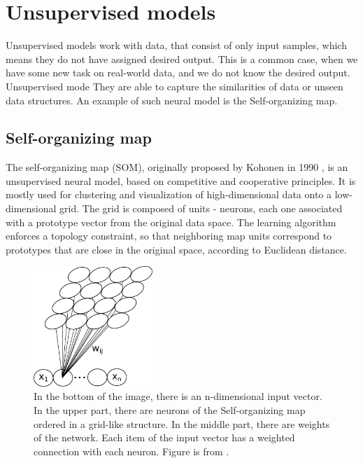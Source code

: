 \section{Unsupervised models}

Unsupervised models work with data, that consist of only input samples, which means they do not have assigned desired output. This is a common case, when we have some new task on real-world data, and we do not know the desired output. Unsupervised mode
They are able to capture the similarities of data or unseen data structures. An example of such neural model is the Self-organizing map.

\subsection{Self-organizing map}
\label{sec:som}

The self-organizing map (SOM), originally proposed by Kohonen in 1990 \cite{kohonen1990}, is an unsupervised neural model, based on competitive and cooperative principles. It is mostly used for clustering and visualization of high-dimensional data onto a low-dimensional grid. The grid is composed of units - neurons, each one associated with a prototype vector from the original data space. The learning algorithm enforces a topology constraint, so that neighboring map units correspond to prototypes that are close in the original space, according to Euclidean distance. \cite{desom2019} 

\begin{figure}[h!]
    \centering
    \includegraphics[width=0.4\textwidth]{figs/som.pdf}
    \caption[Self-organizing map]{In the bottom of the image, there is an n-dimensional input vector. In the upper part, there are neurons of the Self-organizing map ordered in a grid-like structure. In the middle part, there are weights of the network. Each item of the input vector has a weighted connection with each neuron. Figure is from \cite{rebrova2013}.}
    \label{fig:som}
\end{figure}

